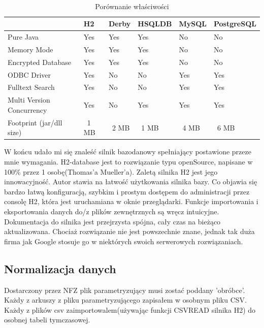 \begin{table}[h]
 \caption{Porównanie właściwości}
 \tiny\tt
 \centering
 \vspace{0in}
 \begin{tabular}{|l|l|l|l|l|l|}
 \hline
  & \textbf{H2} & \textbf{Derby} & \textbf{HSQLDB} & \textbf{MySQL} & \textbf{PostgreSQL} \\
 \hline
 Pure Java & Yes & Yes & Yes & No & No \\
 \hline
 Memory Mode & Yes & Yes & Yes & No & No \\
 \hline
 Encrypted Database & Yes & Yes & Yes & No & No \\
 \hline
 ODBC Driver & Yes & No & No & Yes & Yes \\
 \hline
 Fulltext Search & Yes & No & No & Yes & Yes \\
 \hline
 Multi Version Concurrency & Yes & No & Yes & Yes & Yes \\
 \hline
 Footprint (jar/dll size) & ~1 MB & ~2 MB & ~1 MB & ~4 MB & ~6 MB \\
 \hline
 \end{tabular}
\end{table}

W końcu udało mi się znaleść silnik bazodanowy spełniający postawione przeze mnie wymagania. H2-database jest to rozwiązanie typu openSource, napisane w 100\% przez 1 osobę(Thomas'a Mueller'a). Zaletą silnika H2 jest jego innowacyjność. Autor stawia na łatwość użytkowania silnika bazy. Co objawia się bardzo łatwą konfiguracją, szybkim i prostym dostępem do administracji przez consolę H2, która jest uruchamiana w oknie przeglądarki. Funkcje importowania i eksportowania danych do/z plików zewnętrznych są wręcz intuicyjne. Dokumentacja do silnika jest przejrzysta spójna, cały czas na bieżąco aktualizowana. Chociaż rozwiązanie nie jest powszechnie znane, jednak tak duża firma jak Google stosuje go w niektórych swoich serwerowych rozwiązaniach.

\subsection{Normalizacja danych}
\label{sec:normalizacjaDanych}

Dostarczony przez NFZ plik parametryzujący musi zostać poddany 'obróbce'. Każdy z arkuszy z pliku parametryzującego zapisałem w osobnym pliku CSV. Każdy z plików csv zaimportowalem(używając funkcji CSVREAD silnika H2) do osobnej tabeli tymczasowej.

